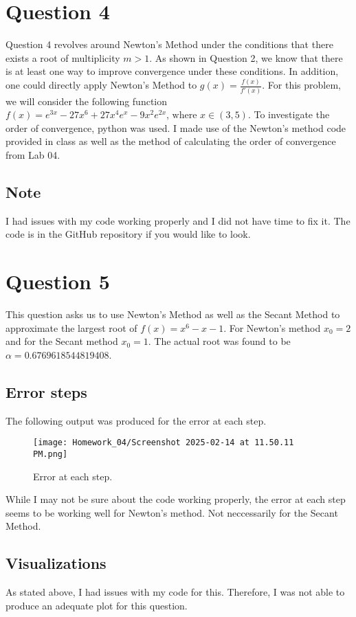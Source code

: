 \documentclass{article}
\begin{document}
\section{Question 4}
Question 4 revolves around Newton's Method under the conditions that there exists a root of multiplicity \(m>1\). As shown in Question 2, we know that there is at least one way to improve convergence under these conditions. In addition, one could directly apply Newton's Method to \(g(x) = \frac{f(x)}{f'(x)}\). For this problem, we will consider the following function \(f(x) = e^{3x}-27x^6+27x^4e^x-9x^2e^{2x} \mbox{, where } x\in(3,5)\). To investigate the order of convergence, python was used. I made use of the Newton's method code provided in class as well as the method of calculating the order of convergence from Lab 04.

\subsection{Note}
I had issues with my code working properly and I did not have time to fix it. The code is in the GitHub repository if you would like to look.

\section{Question 5}
This question asks us to use Newton's Method as well as the Secant Method to approximate the largest root of \(f(x) = x^6-x-1\). For Newton's method \(x_0=2\) and for the Secant method \(x_0=1\). The actual root was found to be \(\alpha = 0.6769618544819408\).
\subsection{Error steps}
The following output was produced for the error at each step.
\begin{figure}[h!]
    \centering
    \texttt{[image: Homework\_04/Screenshot 2025-02-14 at 11.50.11 PM.png]}
    \caption{Error at each step.}
    \label{fig:Figure_02}
\end{figure}
While I may not be sure about the code working properly, the error at each step seems to be working well for Newton's method. Not neccessarily for the Secant Method.
\subsection{Visualizations}
As stated above, I had issues with my code for this. Therefore, I was not able to produce an adequate plot for this question.
\end{document}
